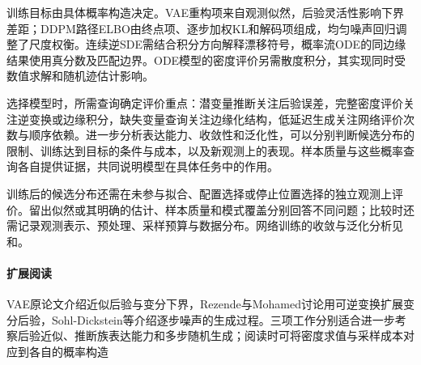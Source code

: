 训练目标由具体概率构造决定。VAE重构项来自观测似然，后验灵活性影响下界差距；DDPM路径ELBO由终点项、逐步加权KL和解码项组成，均匀噪声回归调整了尺度权衡。连续逆SDE需结合积分方向解释漂移符号，概率流ODE的同边缘结果使用真分数及匹配边界。ODE模型的密度评价另需散度积分，其实现同时受数值求解和随机迹估计影响。

选择模型时，所需查询确定评价重点：潜变量推断关注后验误差，完整密度评价关注逆变换或边缘积分，缺失变量查询关注边缘化结构，低延迟生成关注网络评价次数与顺序依赖。进一步分析表达能力、收敛性和泛化性，可以分别判断候选分布的限制、训练达到目标的条件与成本，以及新观测上的表现。样本质量与这些概率查询各自提供证据，共同说明模型在具体任务中的作用。

训练后的候选分布还需在未参与拟合、配置选择或停止位置选择的独立观测上评价。留出似然或其明确的估计、样本质量和模式覆盖分别回答不同问题；比较时还需记录观测表示、预处理、采样预算与数据分布。网络训练的收敛与泛化分析见和。

\paragraph{扩展阅读}
VAE原论文介绍近似后验与变分下界，Rezende与Mohamed讨论用可逆变换扩展变分后验，Sohl-Dickstein等介绍逐步噪声的生成过程。三项工作分别适合进一步考察后验近似、推断族表达能力和多步随机生成；阅读时可将密度求值与采样成本对应到各自的概率构造
